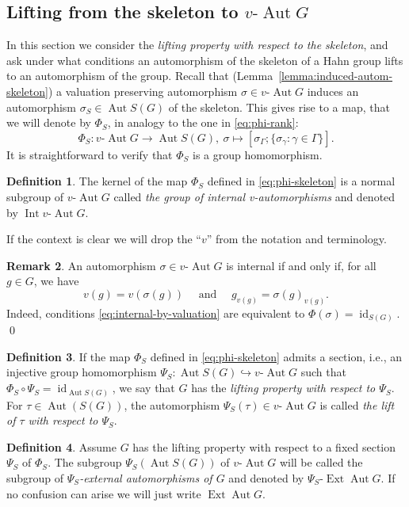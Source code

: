 \documentclass[12pt,a4paper,reqno,openright]{amsart}
\newcommand{\lra}{\longrightarrow}
\renewcommand{\1}{\mathbbm{1}}
\DeclareMathOperator{\id}{id}
\DeclareMathOperator{\Aut}{Aut}
\DeclareMathOperator{\Ext}{Ext}
\DeclareMathOperator{\Int}{Int}
\newcommand{\vAut}{v\text{-}\Aut}
\theoremstyle{definition}
\newtheorem{defn}{Definition}[section]
\theoremstyle{plain}
\theoremstyle{plain}
\theoremstyle{plain}
\theoremstyle{plain}
\theoremstyle{plain}
\theoremstyle{plain}
\theoremstyle{plain}
\theoremstyle{plain}
\theoremstyle{definition}
\theoremstyle{definition}
\theoremstyle{plain}
\theoremstyle{definition}
\theoremstyle{definition}
\newtheorem{rmk}[defn]{Remark}
\theoremstyle{plain}
\theoremstyle{plain}
\theoremstyle{plain}
\begin{document}
\subsection{Lifting from the skeleton to $ \vAut G $}
\label{section-lifting-skeleton}
In this section we consider the \emph{lifting property with respect to the skeleton}, and ask under what conditions an automorphism of the skeleton of a Hahn group lifts to an automorphism of the group.
Recall that (Lemma~\ref{lemma:induced-autom-skeleton}) a valuation preserving automorphism $ \sigma\in\vAut G $ induces an automorphism $ \sigma_S \in\Aut S(G) $ of the skeleton.
This gives rise to a map, that we will denote by $ \Phi_S $, in analogy to the one in \eqref{eq:phi-rank}:
\begin{equation}\label{eq:phi-skeleton}
	\Phi_S\colon \vAut G \lra \Aut S(G),\ \sigma\longmapsto[\sigma_\Gamma;\{\sigma_{\gamma}:\gamma\in\Gamma\}].
\end{equation}
It is straightforward to verify that $ \Phi_S $ is a group homomorphism.

\begin{defn}\label{def:internal}
	The kernel of the map $ \Phi_S $ defined in \eqref{eq:phi-skeleton} is a normal subgroup of $ \vAut G $ called \emph{the group of internal v-automorphisms} and denoted by $ \Int\vAut G $.
	
	If the context is clear we will drop the ``$ v $'' from the notation and terminology.
\end{defn}
\begin{rmk}\label{rmk:internal-by-valuation}
	An automorphism $\sigma\in\vAut G$ is internal if and only if, for all $g\in G$, we have
	\begin{equation}
	\label{eq:internal-by-valuation}
	v(g)=v(\sigma(g))\quad\text{ and }\quad g_{v(g)}=\sigma(g)_{v(g)}.
	\end{equation}
	Indeed, conditions \eqref{eq:internal-by-valuation} are equivalent to $ \Phi(\sigma)=\id_{S(G)} $.
	\qed
\end{rmk}

\begin{defn}\label{def:lifting-property-skeleton}
If the map $ \Phi_S $ defined in \eqref{eq:phi-skeleton} admits a section, i.e., an injective group homomorphism $ \Psi_S\colon \Aut S(G)\hookrightarrow \vAut G $ such that $ \Phi_S\circ\Psi_S = \id_{\Aut S(G)} $, we say that $ G $ has the \emph{lifting property with respect to $ \Psi_S $}.
For $ \tau\in\Aut(S(G)) $, the automorphism $ \Psi_S(\tau)\in\vAut G $ is called \emph{the lift of $ \tau $ with respect to $ \Psi_S $}.
\end{defn}
\begin{defn}
\label{def:skeleton-ext}
Assume $ G $ has the lifting property with respect to a fixed section $ \Psi_S $ of $ \Phi_S $.
The subgroup $ \Psi_S(\Aut S(G)) $ of $ \vAut G $ will be called the subgroup of $ \Psi_S $\emph{-external automorphisms of $G$} and denoted by ${\Psi_S}\text{-}\Ext\Aut G$.
If no confusion can arise we will just write $ \Ext\Aut G $.
\end{defn}
\end{document}
